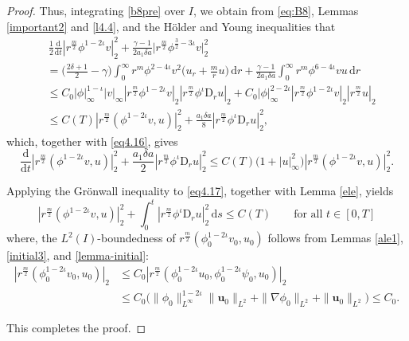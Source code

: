 \documentclass[11pt,reqno]{amsart}
\numberwithin{rk}{section}
\numberwithin{prop}{section}
\numberwithin{mydef}{section}
\numberwithin{lem}{section}
\numberwithin{equation}{section}
\numberwithin{thm}{section}
\begin{document}
\begin{proof}
Thus, integrating \eqref{b8pre} over $I$, we obtain from  \eqref{eq:B8}, Lemmas \ref{important2}  and \ref{l4.4}, 
and the H\"older and Young inequalities that
\begin{equation}\label{555}
\begin{aligned}
&\,\frac{1}{2}\frac{\mathrm{d}}{\mathrm{d}t}|r^\frac{m}{2}\phi^{1-2\iota} v|_2^2+ \frac{\gamma-1}{2a_1\delta a} \big|r^\frac{m}{2}\phi^{\frac{3}{2}-3\iota} v\big|_2^2\\
&=\big(\frac{2\delta+1}{2}-\gamma\big)\int_0^\infty  r^m\phi^{2-4\iota} v^{2} \big(u_r+\frac{m}{r}u\big)\,\mathrm{d}r +\frac{\gamma-1}{2a_1\delta a}\int_0^\infty r^m\phi^{6-4\iota} vu\,\mathrm{d}r\\
&\leq  C_0|\phi|_\infty^{1-\iota}|v|_\infty |r^\frac{m}{2}\phi^{1-2\iota} v|_2|r^\frac{m}{2}\phi^\iota\mathrm{D}_r u|_2+C_0|\phi|_\infty^{2-2\iota} |r^\frac{m}{2}\phi^{1-2\iota} v|_2 |r^\frac{m}{2}u|_2\\
&\leq  C(T)|r^\frac{m}{2}(\phi^{1-2\iota} v,u)|_2^2+\frac{a_1\delta a}{8} |r^\frac{m}{2}\phi^\iota\mathrm{D}_r u|_2^2,
\end{aligned}    
\end{equation}
which, together with \eqref{eq4.16}, gives
\begin{equation}\label{eq4.17}
\frac{\mathrm{d}}{\mathrm{d}t}|r^\frac{m}{2}(\phi^{1-2\iota} v,u)|_2^2 + \frac{a_1\delta a}{2}|r^\frac{m}{2}\phi^\iota\mathrm{D}_r u|_2^2\leq C(T)\big(1+|u|_\infty^2\big)|r^\frac{m}{2}(\phi^{1-2\iota} v,u)|_2^2.
\end{equation}

Applying  the Gr\"onwall  inequality to \eqref{eq4.17}, together with Lemma \ref{ele}, yields
\begin{equation*} 
|r^\frac{m}{2}(\phi^{1-2\iota} v,u)|_2^2+\int_0^t |r^\frac{m}{2}\phi^\iota\mathrm{D}_r u|_2^2 \,\mathrm{d}s\leq C(T)\qquad \text{for all $t\in [0,T]$}
\end{equation*}
where, the $L^2(I)$-boundedness of $r^\frac{m}{2}(\phi_0^{1-2\iota} v_0,u_0)$ follows from Lemmas \ref{ale1}, \ref{initial3}, and  \ref{lemma-initial}:
\begin{equation}\label{chuzhi0}
\begin{aligned}
|r^\frac{m}{2}(\phi_0^{1-2\iota}v_0,u_0)|_2 &\leq C_0|r^\frac{m}{2}(\phi_0^{1-2\iota}u_0,\phi_0^{1-2\iota}\psi_0,u_0)|_2 \\
&\leq C_0\big(\|\phi_0\|_{L^\infty}^{1-2\iota}\|\boldsymbol{u}_0\|_{L^2}+\|\nabla\phi_0\|_{L^2} +\|\boldsymbol{u}_0\|_{L^2}\big)\leq C_0. 
\end{aligned}
\end{equation}

This completes the proof.
\end{proof}
\end{document}
